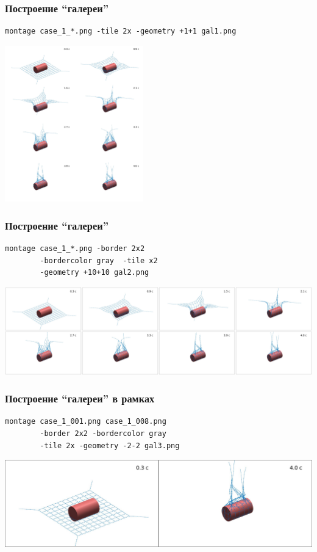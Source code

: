 \documentclass[11pt, compress]{beamer}
\begin{document}
\begin{frame}[c, fragile]
\frametitle{Построение ``галереи''}
\begin{lstlisting}
montage case_1_*.png -tile 2x -geometry +1+1 gal1.png
\end{lstlisting}
\begin{center}
\includegraphics[width=0.45\textwidth]{gal1.png}
\end{center}
\end{frame}


\begin{frame}[c, fragile]
\frametitle{Построение ``галереи''}
\begin{lstlisting}
montage case_1_*.png -border 2x2 
        -bordercolor gray  -tile x2 
        -geometry +10+10 gal2.png
\end{lstlisting}
\begin{center}
\includegraphics[width=1\textwidth]{gal2.png}
\end{center}
\end{frame}


\begin{frame}[c, fragile]
\frametitle{Построение ``галереи'' в рамках}
\begin{lstlisting}
montage case_1_001.png case_1_008.png 
        -border 2x2 -bordercolor gray 
        -tile 2x -geometry -2-2 gal3.png
\end{lstlisting}
\begin{center}
\includegraphics[width=1\textwidth]{gal3.png}
\end{center}
\end{frame}
\end{document}
